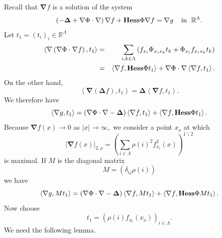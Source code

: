 \documentclass{article}
\begin{document}
Recall that $\mathbf{\nabla }f$ is a solution of the system%
\begin{equation}
\left( -\mathbf{\Delta +\nabla }\Phi \cdot \mathbf{\nabla }\right) \mathbf{%
\nabla }f+\mathbf{Hess}\Phi \mathbf{\nabla }f=\mathbf{\nabla }g\;\;\;\;\text{%
in }\;\mathbb{R}^{\Lambda }.
\end{equation}%
Let $t_{1}=\left( t_{i}\right) _{i}\in \mathbb{R}^{\Lambda }$%
\begin{eqnarray}
\left\langle \mathbf{\nabla }\left( \mathbf{\nabla }\Phi \cdot \mathbf{%
\nabla }f\right) ,t_{1}\right\rangle &=&\sum\limits_{i,k\in \Lambda }\left(
f_{x_{i}}\Phi _{x_{i}x_{k}}t_{k}+\Phi _{x_{i}}f_{x_{i}x_{k}}t_{k}\right) \\
&=&\left\langle \mathbf{\nabla }f,\mathbf{Hess}\Phi t_{1}\right\rangle +%
\mathbf{\nabla }\Phi \cdot \mathbf{\nabla }\left\langle \mathbf{\nabla }%
f,t_{1}\right\rangle .
\end{eqnarray}%
On the other hand, \newline
\begin{equation*}
\left\langle \mathbf{\nabla }\left( \mathbf{\Delta }f\right)
,t_{1}\right\rangle =\mathbf{\Delta }\left\langle \mathbf{\nabla }%
f,t_{1}\right\rangle .
\end{equation*}%
We therefore have%
\begin{equation}
\left\langle \mathbf{\nabla }g,t_{1}\right\rangle =\left( \mathbf{\nabla }%
\Phi \cdot \mathbf{\nabla }-\mathbf{\Delta }\right) \left\langle \mathbf{%
\nabla }f,t_{1}\right\rangle +\left\langle \mathbf{\nabla }f,\mathbf{Hess}%
\Phi t_{1}\right\rangle .
\end{equation}%
Because $\mathbf{\nabla }f(x)\rightarrow 0$ as $\left| x\right| \rightarrow
\infty ,$ we consider a point $x_{o}$ at which \ 
\begin{equation*}
\left| \mathbf{\nabla }f(x)\right| _{2,\rho }=\left( \sum_{i\in \Lambda
}\rho (i)^{2}f_{x_{i}}^{2}(x)\right) ^{1\backslash 2}
\end{equation*}%
is maximal. If $M$ is the diagonal matrix 
\begin{equation*}
M=\left( \delta _{ij}\rho (i)\right)
\end{equation*}%
we have%
\begin{equation}
\left\langle \mathbf{\nabla }g,Mt_{1}\right\rangle =\left( \mathbf{\nabla }%
\Phi \cdot \mathbf{\nabla }-\mathbf{\Delta }\right) \left\langle \mathbf{%
\nabla }f,Mt_{1}\right\rangle +\left\langle \mathbf{\nabla }f,\mathbf{Hess}%
\Phi Mt_{1}\right\rangle .
\end{equation}%
Now choose 
\begin{equation*}
t_{1}=\left( \rho (i)f_{x_{i}}(x_{o})\right) _{i\in \Lambda }.
\end{equation*}%
We need the following lemma.
\end{document}

